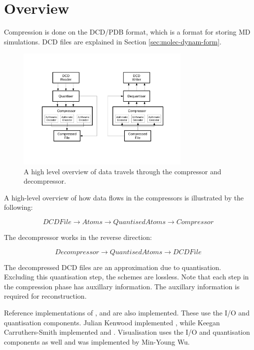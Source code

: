 \documentclass[a4paper]{report}
\begin{document}
\section{Overview}

Compression is done on the DCD/PDB format, which is a format for storing MD
simulations. DCD files are explained in Section \ref{sec:molec-dynam-form}.

\begin{figure}
  \centering
  \includegraphics[trim = 30mm 40mm 30mm 35mm, clip, width=0.75\textwidth]{images/overview}
  \caption{A high level overview of data travels through the compressor and
    decompressor.}
  \label{fig:dimer-angle}
\end{figure}

A high-level overview of how data flows in the compressors is illustrated by
the following:

\[ DCDFile \to Atoms \to QuantisedAtoms \to Compressor \]

The decompressor works in the reverse direction:

\[ Decompressor \to QuantisedAtoms \to DCDFile \]

The decompressed DCD files are an approximation due to quantisation. Excluding
this quantisation step, the schemes are lossless. Note that each step in the
compression phase has auxillary information. The auxillary information is
required for reconstruction.

Reference implementations of \citet{devillers2000gci}, \citet{gumholdcomp} and
\citet{omeltchenko2000sls} are also implemented. These use the I/O and
quantisation components. Julian Kenwood implemented
\citet{omeltchenko2000sls}, while Keegan Carruthers-Smith implemented
\citet{devillers2000gci} and \citet{gumholdcomp}. Visualisation uses the I/O
and quantisation components as well and was implemented by Min-Young Wu.
\end{document}
